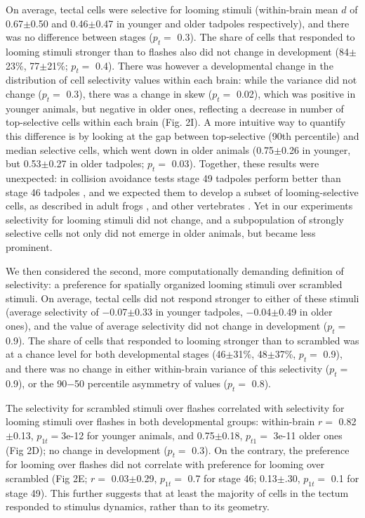 \documentclass{article}
\begin{document}
On average, tectal cells were selective for looming stimuli (within-brain mean $d$ of 0.67$\pm$0.50 and 0.46$\pm$0.47 in younger and older tadpoles respectively), and there was no difference between stages ($p_t=$ 0.3). The share of cells that responded to looming stimuli stronger than to flashes also did not change in development (84$\pm$23\%, 77$\pm$21\%; $p_t=$ 0.4). There was however a developmental change in the distribution of cell selectivity values within each brain: while the variance did not change ($p_t=$ 0.3), there was a change in skew ($p_t=$ 0.02), which was positive in younger animals, but negative in older ones, reflecting a decrease in number of top-selective cells within each brain (Fig. 2I). A more intuitive way to quantify this difference is by looking at the gap between top-selective (90th percentile) and median selective cells, which went down in older animals (0.75$\pm$0.26 in younger, but 0.53$\pm$0.27 in older tadpoles; $p_t=$ 0.03). Together, these results were unexpected: in collision avoidance tests stage 49 tadpoles perform better than stage 46 tadpoles \citep{dong2009}, and we expected them to develop a subset of looming-selective cells, as described in adult frogs \citep{nakagawa2010otneurons,baranauskas2012}, and other vertebrates \citep{wang1992pigeon,wu2005pigeon,liu2011cat}. Yet in our experiments selectivity for looming stimuli did not change, and a subpopulation of strongly selective cells not only did not emerge in older animals, but became less prominent.

We then considered the second, more computationally demanding definition of selectivity: a preference for spatially organized looming stimuli over scrambled stimuli. On average, tectal cells did not respond stronger to either of these stimuli (average selectivity of $-$0.07$\pm$0.33 in younger tadpoles, $-$0.04$\pm$0.49 in older ones), and the value of average selectivity did not change in development ($p_t=$ 0.9). The share of cells that responded to looming stronger than to scrambled was at a chance level for both developmental stages (46$\pm$31\%, 48$\pm$37\%, $p_t=$ 0.9), and there was no change in either within-brain variance of this selectivity ($p_t=$ 0.9), or the 90$-$50 percentile asymmetry of values ($p_t=$ 0.8).

The selectivity for scrambled stimuli over flashes correlated with selectivity for looming stimuli over flashes in both developmental groups: within-brain $r=$ 0.82$\pm$0.13, $p_{1t}=$3e-12 for younger animals, and 0.75$\pm$0.18, $p_{t1}=$ 3e-11 older ones (Fig 2D); no change in development ($p_t=$ 0.3). On the contrary, the preference for looming over flashes did not correlate with preference for looming over scrambled (Fig 2E; $r=$ 0.03$\pm$0.29, $p_{1t}=$ 0.7 for stage 46; 0.13$\pm$.30, $p_{1t}=$ 0.1 for stage 49). This further suggests that at least the majority of cells in the tectum responded to stimulus dynamics, rather than to its geometry.
\end{document}

